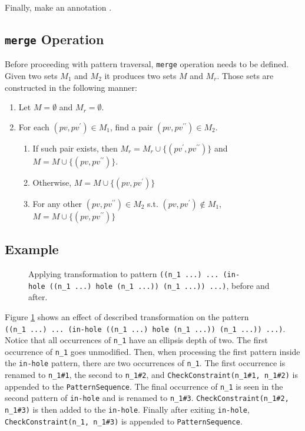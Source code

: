 Finally, make an annotation .

\subsection{\texttt{merge} Operation}
Before proceeding with pattern traversal, \texttt{merge} operation needs to be defined. Given two sets $M_1$ and $M_2$ it produces two sets $M$ and $M_r$. Those sets are constructed in the following manner:

\begin{enumerate}
\item Let $M=\emptyset$ and $M_r=\emptyset$.
\item For each $(pv, pv^{\prime}) \in M_1$, find a pair $(pv, pv^{\prime\prime}) \in M_2$.
\begin{enumerate}
\item If such pair exists, then $M_r=M_r \cup \{(pv^{\prime},  pv^{\prime\prime})\}$ and $M=M \cup \{(pv,  pv^{\prime\prime})\}$.
\item Otherwise, $M=M \cup \{(pv,  pv^{\prime})\}$
\item For any other $(pv, pv^{\prime\prime}) \in M_2$ s.t.  $(pv, pv^{\prime}) \notin M_1$, $M=M \cup \{(pv,  pv^{\prime\prime})\}$
\end{enumerate}
\end{enumerate}

\subsection{Example}

\begin{figure}[ht]
	\centering
\caption{Applying transformation to pattern \texttt{((n\_1\ ...)\ ...\ (in-hole\ ((n\_1\ ...)\ hole\ (n\_1\ ...))\ (n\_1\ ...))\ ...)}, before and after.}
\label{transformation-pattern-constraintcheck}
\end{figure}

Figure \ref{transformation-pattern-constraintcheck} shows an effect of described transformation on the pattern \texttt{((n\_1\ ...)\ ...\ (in-hole\ ((n\_1\ ...)\ hole\ (n\_1\ ...))\ (n\_1\ ...))\ ...)}. Notice that all occurrences of \texttt{n\_1} have an ellipsis depth of two. The first occurrence of \texttt{n\_1} goes unmodified. Then, when processing the first pattern inside the \texttt{in-hole} pattern, there are two occurrences of \texttt{n\_1}. The first occurrence is renamed to \texttt{n\_1\#1}, the second to \texttt{n\_1\#2}, and \texttt{CheckConstraint(n\_1\#1, n\_1\#2)} is appended to the \texttt{PatternSequence}. The final occurrence of \texttt{n\_1} is seen in the second pattern of \texttt{in-hole} and is renamed to \texttt{n\_1\#3}. \texttt{CheckConstraint(n\_1\#2, n\_1\#3)} is then added to the \texttt{in-hole}. Finally after exiting \texttt{in-hole}, \texttt{CheckConstraint(n\_1, n\_1\#3)} is appended to \texttt{PatternSequence}.
